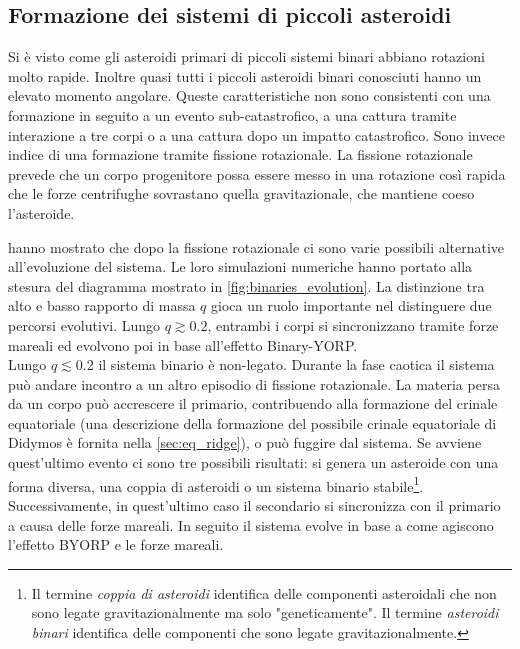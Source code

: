 \subsection{Formazione dei sistemi di piccoli asteroidi}
Si è visto come gli asteroidi primari di piccoli sistemi binari abbiano rotazioni molto rapide. Inoltre quasi tutti i piccoli asteroidi binari conosciuti hanno un elevato momento angolare. Queste caratteristiche non sono consistenti con una formazione in seguito a un evento sub-catastrofico, a una cattura tramite interazione a tre corpi o a una cattura dopo un impatto catastrofico. Sono invece indice di una formazione tramite fissione rotazionale. La fissione rotazionale prevede che un corpo progenitore possa essere messo in una rotazione così rapida che le forze centrifughe sovrastano quella gravitazionale, che mantiene coeso l'asteroide.

\citet{jacobson_dynamics_2011} hanno mostrato che dopo la fissione rotazionale ci sono varie possibili alternative all'evoluzione del sistema. Le loro simulazioni numeriche hanno portato alla stesura del diagramma mostrato in \cref{fig:binaries_evolution}. La distinzione tra alto e basso rapporto di massa $q$ gioca un ruolo importante nel distinguere due percorsi evolutivi. Lungo $q\gtrsim0.2$, entrambi i corpi si sincronizzano tramite forze mareali ed evolvono poi in base all'effetto Binary-YORP.\\
Lungo $q\lesssim0.2$ il sistema binario è non-legato. Durante la fase caotica il sistema può andare incontro a un altro episodio di fissione rotazionale. La materia persa da un corpo può accrescere il primario, contribuendo alla formazione del crinale equatoriale (una descrizione della formazione del possibile crinale equatoriale di Didymos è fornita nella \cref{sec:eq_ridge}), o può fuggire dal sistema. Se avviene quest'ultimo evento ci sono tre possibili risultati: si genera un asteroide con una forma diversa, una coppia di asteroidi o un sistema binario stabile\footnote{Il termine \textit{coppia di asteroidi} identifica delle componenti asteroidali che non sono legate gravitazionalmente ma solo "geneticamente". Il termine \textit{asteroidi binari} identifica delle componenti che sono legate gravitazionalmente.}. Successivamente, in quest'ultimo caso il secondario si sincronizza con il primario a causa delle forze mareali. In seguito il sistema evolve in base a come agiscono l'effetto BYORP e le forze mareali.


